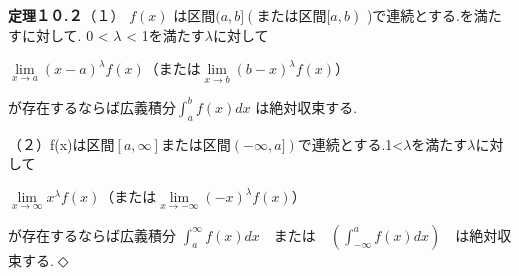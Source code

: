 \documentclass[10.5pt,uplatex,a5paper]{jsarticle} %
\begin{document}
\textbf{定理１０.２}（１） $f(x)$ は区間$(a,b] (または区間[a,b)$ )で連続とする.を満たすに対して. 0 < $\lambda$ < 1を満たす$\lambda$に対して

\begin{center}

    $\lim\limits_{x \to a} (x-a)^{\lambda}f(x) （または　\lim\limits_{x \to b} (b-x)^{\lambda}f(x)）$
    
\end{center}

が存在するならば広義積分$\int_a^b f(x) dx$ は絶対収束する.

（２）f(x)は区間$[a,\infty]$または区間$(-\infty,a])$で連続とする.1<$\lambda$を満たす$\lambda$に対して

\begin{center}

    $\lim\limits_{x \to \infty} x^{\lambda}f(x) （または　\lim\limits_{x \to -\infty} (-x)^{\lambda}f(x)）$
    
\end{center}

が存在するならば広義積分 $\int_a^\infty f(x)dx$　または　$\left(\int_{-\infty}^a f(x)dx\right)$　は絶対収束する.$\Diamond$
\end{document}
